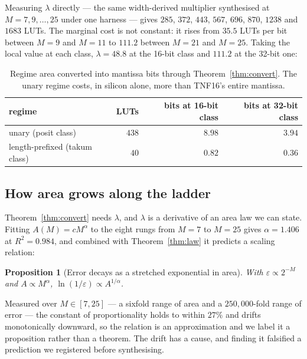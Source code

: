 \documentclass[11pt]{article}
\newtheorem{proposition}[theorem]{Proposition}
\theoremstyle{definition}
\begin{document}
Measuring $\lambda$ directly --- the same width-derived multiplier synthesised at
$M = 7, 9, \ldots, 25$ under one harness --- gives $285$, $372$, $443$, $567$,
$696$, $870$, $1238$ and $1683$ LUTs. The marginal cost is not constant: it rises
from $35.5$ LUTs per bit between $M{=}9$ and $M{=}11$ to $111.2$ between $M{=}21$
and $M{=}25$. Taking the local value at each class, $\lambda = 48.8$ at the
16-bit class and $111.2$ at the 32-bit one:

\begin{table}[t]\centering
\caption{Regime area converted into mantissa bits through
Theorem~\ref{thm:convert}. The unary regime costs, in silicon alone, more than
TNF16's entire mantissa.}
\label{tab:convert}
\begin{tabular}{lrrr}
\toprule
regime & LUTs & bits at 16-bit class & bits at 32-bit class \\
\midrule
unary (posit class)          & $438$ & $\mathbf{8.98}$ & $3.94$ \\
length-prefixed (takum class) & $40$  & $0.82$ & $0.36$ \\
\bottomrule
\end{tabular}
\end{table}


\subsection{How area grows along the ladder}\label{sec:arealaw}

Theorem~\ref{thm:convert} needs $\lambda$, and $\lambda$ is a derivative of an
area law we can state. Fitting $A(M) = cM^{\alpha}$ to the eight rungs from
$M{=}7$ to $M{=}25$ gives $\alpha = 1.406$ at $R^2 = 0.984$, and combined with
Theorem~\ref{thm:law} it predicts a scaling relation:

\begin{proposition}[Error decays as a stretched exponential in area]
\label{prop:stretched}
With $\varepsilon \propto 2^{-M}$ and $A \propto M^{\alpha}$,
$\ln(1/\varepsilon) \propto A^{1/\alpha}$.
\end{proposition}

Measured over $M \in [7,25]$ --- a sixfold range of area and a $250{,}000$-fold
range of error --- the constant of proportionality holds to within $27\%$ and
drifts monotonically downward, so the relation is an approximation and we label
it a proposition rather than a theorem. The drift has a cause, and finding it
falsified a prediction we registered before synthesising.
\end{document}
